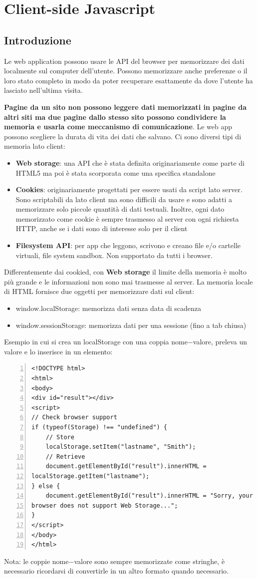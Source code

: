 \chapter{Client-side Javascript}
\section{Introduzione}
Le web application possono usare le API del browser per memorizzare dei dati localmente sul computer dell'utente. Possono memorizzare anche preferenze o il loro stato completo in modo da poter recuperare esattamente da dove l'utente ha lasciato nell'ultima visita. 

\textbf{Pagine da un sito non possono leggere dati memorizzati in pagine da altri siti ma due pagine dallo stesso sito possono condividere la memoria e usarla come meccanismo di comunicazione}. Le web app possono scegliere la durata di vita dei dati che salvano. Ci sono diversi tipi di memoria lato client:
\begin{itemize}
    \item \textbf{Web storage}: una API che è stata definita originariamente come parte di HTML5 ma poi è stata scorporata come una specifica standalone
    \item \textbf{Cookies}: originariamente progettati per essere usati da script lato server. Sono scriptabili da lato client ma sono difficili da usare e sono adatti a memorizzare solo piccole quantità di dati testuali. Inoltre, ogni dato memorizzato come cookie è sempre trasmesso al server con ogni richiesta HTTP, anche se i dati sono di interesse solo per il client
    \item \textbf{Filesystem API}: per app che leggono, scrivono e creano file e/o cartelle virtuali, file system sandbox. Non supportato da tutti i browser. 
\end{itemize}
Differentemente dai cookied, con \textbf{Web storage} il limite della memoria è molto più grande e le informazioni non sono mai trasmesse al server. La memoria locale di HTML fornisce due oggetti per memorizzare dati sul client:
\begin{itemize}
    \item window.localStorage: memorizza dati senza data di scadenza
    \item window.sessionStorage: memorizza dati per una sessione (fino a tab chiusa)
\end{itemize}
Esempio in cui si crea un localStorage con una coppia nome$-$valore, preleva un valore e lo inserisce in un elemento:
\begin{Verbatim}[numbers = left, frame = single]
<!DOCTYPE html>
<html>
<body>
<div id="result"></div>
<script>
// Check browser support
if (typeof(Storage) !== "undefined") {
    // Store
    localStorage.setItem("lastname", "Smith");
    // Retrieve
    document.getElementById("result").innerHTML =
localStorage.getItem("lastname");
} else {
    document.getElementById("result").innerHTML = "Sorry, your
browser does not support Web Storage...";
}
</script>
</body>
</html>
\end{Verbatim}
Nota: le coppie nome$-$valore sono sempre memorizzate come stringhe, è necessario ricordarsi di convertirle in un altro formato quando necessario.


